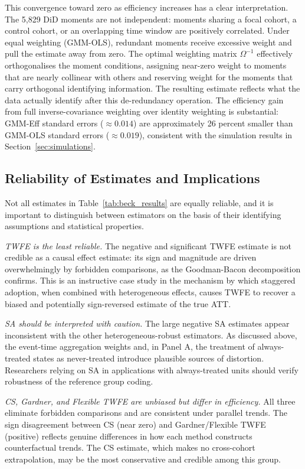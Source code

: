 This convergence toward zero as efficiency increases has a clear
interpretation. The 5{,}829 DiD moments are not independent: moments
sharing a focal cohort, a control cohort, or an overlapping time
window are positively correlated. Under equal weighting (GMM-OLS),
redundant moments receive excessive weight and pull the estimate away
from zero. The optimal weighting matrix $\Omega^{-1}$ effectively
orthogonalises the moment conditions, assigning near-zero weight to
moments that are nearly collinear with others and reserving
weight for the moments that carry orthogonal identifying information.
The resulting estimate reflects what the data actually identify after
this de-redundancy operation. The efficiency gain from full
inverse-covariance weighting over identity weighting is substantial:
GMM-Eff standard errors ($\approx 0.014$) are approximately 26 percent
smaller than GMM-OLS standard errors ($\approx 0.019$), consistent
with the simulation results in Section~\ref{sec:simulations}.

\subsection{Reliability of Estimates and Implications}
\label{subsec:reliability}

Not all estimates in Table~\ref{tab:beck_results} are equally reliable,
and it is important to distinguish between estimators on the basis of
their identifying assumptions and statistical properties.

\textit{TWFE is the least reliable.} The negative and significant TWFE
estimate is not credible as a causal effect estimate: its sign and
magnitude are driven overwhelmingly by forbidden comparisons, as the
Goodman-Bacon decomposition confirms. This is an instructive case study
in the mechanism by which staggered adoption, when combined with
heterogeneous effects, causes TWFE to recover a biased and potentially
sign-reversed estimate of the true ATT.

\textit{SA should be interpreted with caution.} The large negative SA
estimates appear inconsistent with the other heterogeneous-robust
estimators. As discussed above, the event-time aggregation weights
and, in Panel A, the treatment of always-treated states as
never-treated introduce plausible sources of distortion. Researchers
relying on SA in applications with always-treated units should verify
robustness of the reference group coding.

\textit{CS, Gardner, and Flexible TWFE are unbiased but differ in
efficiency.} All three eliminate forbidden comparisons and are
consistent under parallel trends. The sign disagreement between
CS (near zero) and Gardner/Flexible TWFE (positive) reflects
genuine differences in how each method constructs counterfactual
trends. The CS estimate, which makes no cross-cohort extrapolation,
may be the most conservative and credible among this group.

